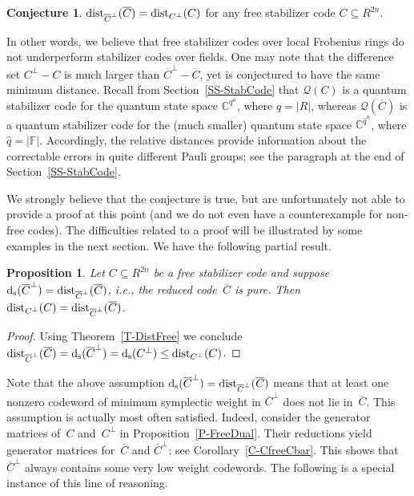 \documentclass[11pt]{article}
\newtheorem{prop}[theo]{Proposition}
\theoremstyle{definition}
\newtheorem{conj}[theo]{Conjecture}
\numberwithin{equation}{section}
\newcommand{\F}{{\mathbb F}}
\newcommand{\C}{{\mathbb C}}
\newcommand{\cQ}{{\mathcal Q}}
\newcommand{\ds}{\mbox{${\rm d}_{\rm s}$}}
\newcommand{\ov}[1]{\mbox{$\overline{#1}$}}
\newcommand{\dist}{\textup{dist}}
\newcounter{ara}
\newcounter{rom}
\begin{document}
\begin{conj}\label{C-RelDist}
$\dist_{\small{\overline{C}^\perp}}(\ov{C})=\dist_{C^\perp}(C)$ for any free stabilizer code $C\subseteq R^{2n}$.
\end{conj}

In other words, we believe that free stabilizer codes over local Frobenius rings do not underperform stabilizer codes over fields.
One may note that the difference set $C^\perp-C$ is much larger than $\ov{C}^\perp-\ov{C}$, yet is conjectured to have the same minimum distance.
Recall from Section~\ref{SS-StabCode} that $\cQ(C)$ is a quantum stabilizer code for the quantum state space $\C^{q^n}$, where $q=|R|$,
whereas  $\cQ(\ov{C})$ is a quantum stabilizer code for the (much smaller) quantum state space $\C^{\hat{q}^n}$, where $\hat{q}=|\F|$.
Accordingly, the relative distances provide information about the correctable errors in quite different Pauli groups; see the paragraph at the end of Section~\ref{SS-StabCode}.

We strongly believe that the conjecture is true, but are unfortunately not able to
provide a proof at this point (and we do not even have a counterexample for non-free codes).
The difficulties related to a proof will be illustrated by some examples in the next section.
We have the following partial result.

\begin{prop}\label{P-Partial}
Let $C\subseteq R^{2n}$ be a free stabilizer code and suppose $\ds(\ov{C}^{\perp})=\dist_{\small{\overline{C}^\perp}}(\ov{C})$, i.e., the reduced code~$\ov{C}$ is pure. Then
$\dist_{C^\perp}(C)=\dist_{\small{\overline{C}^\perp}}(\ov{C})$.
\end{prop}

\begin{proof}
Using Theorem~\ref{T-DistFree} we conclude
$\dist_{\small{\overline{C}^\perp}}(\ov{C})=\ds(\ov{C}^{\perp})=\ds(C^{\perp})\leq\dist_{C^\perp}(C)$.
\end{proof}


Note that the above assumption $\ds(\ov{C}^{\perp})=\dist_{\small{\overline{C}^\perp}}(\ov{C})$ means that at least one nonzero codeword of minimum symplectic weight in $\ov{C}^{\perp}$
does not lie in~$\ov{C}$.
This assumption is actually most often satisfied.
Indeed, consider the generator matrices of~$C$ and~$C^{\perp}$ in Proposition~\ref{P-FreeDual}.
Their reductions yield generator matrices for~$\ov{C}$ and $\ov{C}^{\perp}$; see Corollary~\ref{C-CfreeCbar}.
This shows that~$\ov{C}^{\perp}$ always contains some very low weight codewords.
The following is a special instance of this line of reasoning.
\end{document}
